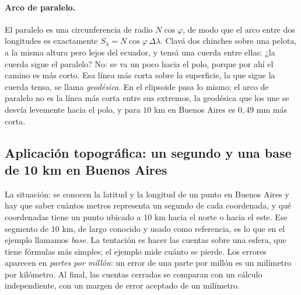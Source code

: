 \paragraph{Arco de paralelo.} El paralelo es una circunferencia de radio \(N\cos\varphi\), de
modo que el arco entre dos longitudes es exactamente \(S_\lambda=N\cos\varphi\,\Delta\lambda\).
Clavá dos chinches sobre una pelota, a la misma altura pero lejos del ecuador, y tensá una
cuerda entre ellas: ¿la cuerda sigue el paralelo? No: se va un poco hacia el polo, porque por
ahí el camino es más corto. Esa línea más corta sobre la superficie, la que sigue la cuerda
tensa, se llama \emph{geodésica}. En el elipsoide pasa lo mismo: el arco de paralelo no es la
línea más corta entre sus extremos, la geodésica que los une se desvía
levemente hacia el polo, y para \(10\) km en Buenos Aires es \(0{,}49\) mm más corta.

\subsection{Aplicación topográfica: un segundo y una base de 10 km en Buenos Aires}

La situación: se conocen la latitud y la longitud de un punto en Buenos Aires y hay que saber
cuántos metros representa un segundo de cada coordenada, y qué coordenadas tiene un punto
ubicado a \(10\) km hacia el norte o hacia el este. Ese segmento de \(10\) km, de largo
conocido y usado como referencia, es lo que en el ejemplo llamamos \emph{base}. La tentación es
hacer las cuentas sobre una esfera, que tiene fórmulas más simples; el ejemplo mide cuánto se
pierde. Los errores aparecen en \emph{partes por millón}: un error de una parte por millón es un
milímetro por kilómetro. Al final, las cuentas cerradas se comparan con un cálculo
independiente, con un margen de error aceptado de un milímetro.

